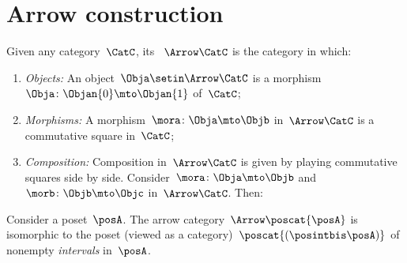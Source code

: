
\section{Arrow construction}


\begin{ctdefinition}
    \label{def:arrow_category}
    Given any category~$\CatC$, its \emph{}~$\Arrow\CatC$ is the category in which:
    \begin{enumerate}
        \item \emph{Objects:} An object~$\Obja \setin \Arrow\CatC$ is a morphism~$\Obja\colon \Objan{0}\mto \Objan{1}$ of~$\CatC$;
        \item \emph{Morphisms:} A morphism~$\mora\colon \Obja \mto \Objb$ in~$\Arrow\CatC$ is a commutative square
        in~$\CatC$;
        \item \emph{Composition:} Composition in~$\Arrow \CatC$ is given by playing commutative squares side by side.
        Consider~$\mora\colon \Obja \mto \Objb$ and~$\morb\colon \Objb \mto \Objc$ in~$\Arrow\CatC$.
        Then:
    \end{enumerate}
\end{ctdefinition}

\begin{example}[Intervals]
    \label{exa:arrow-poset}
    Consider a poset~$\posA$.
    The arrow category~$\Arrow \poscat{\posA}$ is isomorphic to the poset (viewed as a category)~$\poscat{\left(\posintbis\posA\right)}$ of nonempty \emph{intervals} in~$\posA$.
\end{example}


